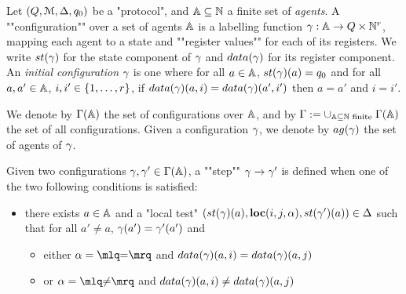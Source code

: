 \begin{definition}[Semantics]
	Let $(Q,\mathcal{M}, \Delta, q_0)$ be a "protocol", and $\mathbb{A} \subseteq \mathbb{N}$ a finite set of \emph{agents}.
	A ""configuration"" over a set of agents $\mathbb{A}$ is a labelling function $\gamma : \mathbb{A} \to Q \times \mathbb{N}^{r}$, mapping each agent to a state and ""register values"" for each of its registers. 
	We write $\st{\config}$ for the state component of $\gamma$ and $\data{\config}$ for its register component.
	An \emph{initial configuration} $\gamma$ is one where for all $a \in \mathbb{A}$, $\st{\config}(a) = q_0$ and for all $a, a' \in \mathbb{A}$, $i, i' \in \{1,\dots,r\}$, if $\data{\config}(a, i) = \data{\config}(a', i')$ then $a=a'$ and $i=i'$.
	
	\AP We denote by $\Gamma(\mathbb{A})$ the set of configurations over $\mathbb{A}$, and by $\Gamma := \cup_{\mathbb{A} \subseteq \mathbb{N} \text{ finite }} \Gamma(\mathbb{A})$ the set of all configurations. Given a configuration $\gamma$, we denote by $\agentsof{\config}$ the set of agents of $\gamma$.
	
	\AP Given two configurations $\gamma, \gamma' \in \Gamma(\mathbb{A})$, a ""step"" $\gamma \xrightarrow{} \gamma'$ is defined when one of the two following conditions is satisfied:
	\begin{itemize}
		\item there exists $a \in \mathbb{A}$ and a "local test" $(\st{\config}(a), \loc{i}{j}{\anact}, \st{\config'}(a)) \in \transitions$ such that for all $a'\neq a$, $\gamma(a') = \gamma'(a')$ and
		\begin{itemize}
			\item either $\anact = \quotemarks{\eqtestact}$ and $\data{\config}(a,i) = \data{\config}(a,j)$
			
			\item or $\anact = \quotemarks{\diseqtestact}$ and $\data{\config}(a,i) \neq \data{\config}(a,j)$
		\end{itemize}
		

\end{itemize}
\end{definition}
